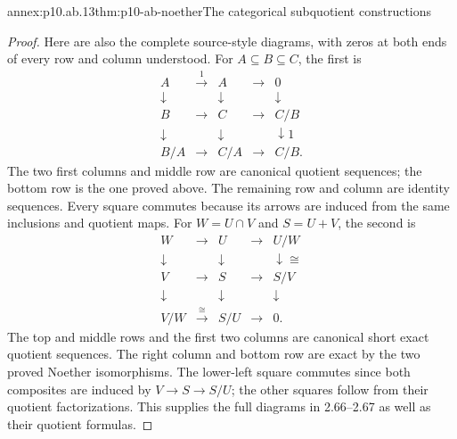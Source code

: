 \begin{annexitem}{annex:p10.ab.13}{thm:p10-ab-noether}{The categorical subquotient constructions}
\begin{proof}
Here are also the complete source-style diagrams, with zeros at both
ends of every row and column understood. For \(A\subseteq B\subseteq C\),
the first is
\[
\begin{array}{ccccc}
A&\xrightarrow{1}&A&\longrightarrow&0\\
\downarrow&&\downarrow&&\downarrow\\
B&\longrightarrow&C&\longrightarrow&C/B\\
\downarrow&&\downarrow&&\downarrow 1\\
B/A&\longrightarrow&C/A&\longrightarrow&C/B.
\end{array}
\]
The two first columns and middle row are canonical quotient sequences;
the bottom row is the one proved above. The remaining row and column
are identity sequences. Every square commutes because its arrows are
induced from the same inclusions and quotient maps.
For \(W=U\cap V\) and \(S=U+V\), the second is
\[
\begin{array}{ccccc}
W&\longrightarrow&U&\longrightarrow&U/W\\
\downarrow&&\downarrow&&\downarrow\scriptstyle\cong\\
V&\longrightarrow&S&\longrightarrow&S/V\\
\downarrow&&\downarrow&&\downarrow\\
V/W&\xrightarrow{\cong}&S/U&\longrightarrow&0.
\end{array}
\]
The top and middle rows and the first two columns are canonical short
exact quotient sequences. The right column and bottom row are exact
by the two proved Noether isomorphisms. The lower-left square commutes
since both composites are induced by \(V\to S\to S/U\);
the other squares follow from their quotient factorizations. This
supplies the full diagrams in 2.66--2.67 as well as their quotient formulas.
\end{proof}
\end{annexitem}


